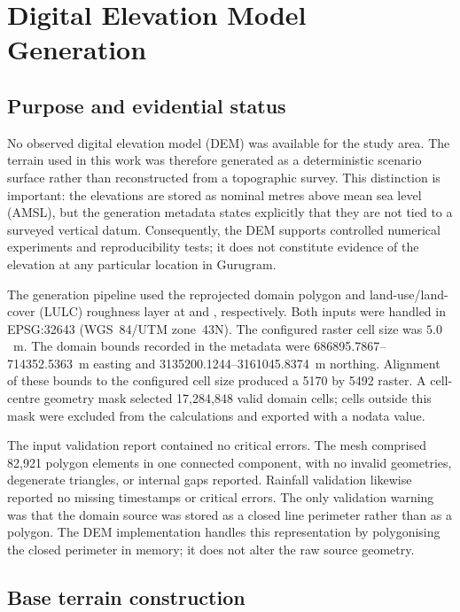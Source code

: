 \section{Digital Elevation Model Generation}
\label{sec:dem-generation}

\subsection{Purpose and evidential status}

No observed digital elevation model (DEM) was available for the study area.
The terrain used in this work was therefore generated as a deterministic
scenario surface rather than reconstructed from a topographic survey.  This
distinction is important: the elevations are stored as nominal metres above
mean sea level (AMSL), but the generation metadata states explicitly that they
are not tied to a surveyed vertical datum.  Consequently, the DEM supports
controlled numerical experiments and reproducibility tests; it does not
constitute evidence of the elevation at any particular location in Gurugram.

The generation pipeline used the reprojected domain polygon and land-use/land-
cover (LULC) roughness layer at
 and
, respectively.  Both inputs
were handled in EPSG:32643 (WGS~84/UTM zone~43N).  The configured raster cell
size was \(5.0\)~m.  The domain bounds recorded in the metadata were
686895.7867--714352.5363~m easting and
3135200.1244--3161045.8374~m northing.  Alignment of these bounds to the
configured cell size produced a 5170 by 5492 raster.  A cell-centre geometry
mask selected 17,284,848 valid domain cells; cells outside this mask were
excluded from the calculations and exported with a nodata value.

The input validation report contained no critical errors.  The mesh comprised
82,921 polygon elements in one connected component, with no invalid
geometries, degenerate triangles, or internal gaps reported.  Rainfall
validation likewise reported no missing timestamps or critical errors.  The
only validation warning was that the domain source was stored as a closed line
perimeter rather than as a polygon.  The DEM implementation handles this
representation by polygonising the closed perimeter in memory; it does not
alter the raw source geometry.

\subsection{Base terrain construction}

